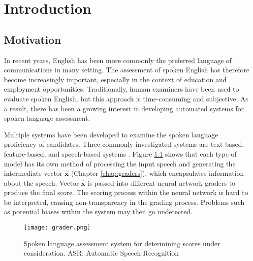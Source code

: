 \chapter{Introduction}

\section{Motivation}
In recent years, English has been more commonly the preferred language of communications in many setting. The assessment of spoken English has therefore become increasingly important, especially in the context of education and employment opportunities. Traditionally, human examiners have been used to evaluate spoken English, but this approach is time-consuming and subjective. As a result, there has been a growing interest in developing automated systems for spoken language assessment.

Multiple systems have been developed to examine the spoken language proficiency of candidates. Three commonly investigated systems are text-based, feature-based, and speech-based systems \cite{graders}. Figure \ref{fig:grader} shows that each type of model has its own method of processing the input speech and generating the intermediate vector $\mathbf{\hat{x}}$ (Chapter \ref{chap:graders}), which encapsulates information about the speech. Vector $\mathbf{\hat{x}}$ is passed into different neural network graders to produce the final score. The scoring process within the neural network is hard to be interpreted, causing non-transparency in the grading process. Problems such as potential biases within the system may then go undetected.

\begin{figure}[H]
    \centering
    \texttt{[image: grader.png]}
    \caption{Spoken language assessment system for determining scores under consideration. ASR: Automatic Speech Recognition}
    \label{fig:grader}
\end{figure}


